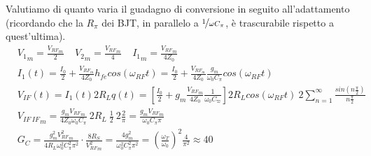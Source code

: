 Valutiamo di quanto varia il guadagno di conversione in seguito all'adattamento (ricordando che la $R_\pi$ dei BJT, in parallelo a $\nicefrac{1}{\omega C_{\pi}}$, è trascurabile rispetto a quest'ultima).
\begin{align*}
&{V_1}_m = \frac{{V_{RF}}_m}{2} ~~~~~ {V_2}_m = \frac{{V_{RF}}_m}{4} ~~~~~ {I_1}_m = \frac{{V_{RF}}_m}{4Z_0}\\
& I_1(t) = \frac{I_0}{2} + \frac{V_{RF_m}}{4 Z_0} h_{fe} cos (\omega_{RF} t)
= \frac{I_0}{2} + \frac{V_{RF_m}}{4 Z_0} \frac{g_m }{\omega_0 C_\pi} cos (\omega_{RF} t)\\
&V_{IF}(t) = I_1(t) 2R_L q(t) =
\left[\frac{I_0}{2} + g_m \frac{{V_{RF}}_m}{4 Z_0} \frac{1}{\omega_0 C_\varpi}\right] 2R_L cos (\omega_{RF} t) ~ 2 \sum_{n=1}^{\infty} \frac{sin \left( n \frac{\pi}{2} \right)}{n\frac{\pi}{2}}
\\
&{V_{IF~IF}}_m = \frac{g_m {V_{RF}}_m}{4 Z_0 \omega_0 C_\pi} ~ 2R_L~ \frac{1}{2} ~ 2 \frac{2}{\pi} = \frac{g_m {V_{RF}}_m}{\omega_0 C_\pi \pi}\\
&G_C = \frac{g_m^2 {V_{RF}^2}_m}{4 R_L \omega_0^2 C_\pi^2 \pi^2} \cdot \frac{8 R_S}{{V^2_{RF}}_m} = 
\frac{4g_m^2}{\omega_0^2 C_\pi^2 \pi^2}
=
\left(\frac{\omega_T}{\omega_0}\right)^2
\frac{4}{\pi^2}
\approx 40
\end{align*}

